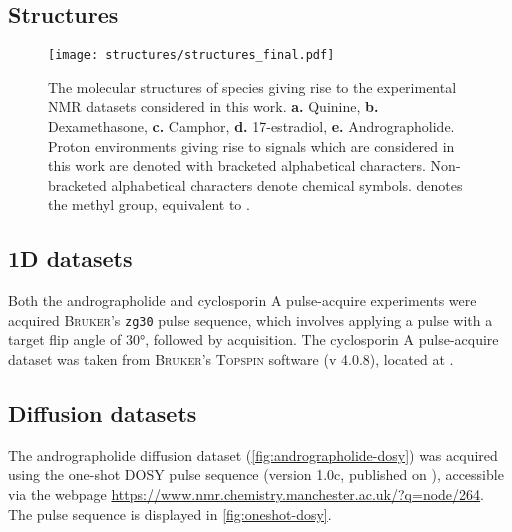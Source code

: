 \subsection{Structures}

\begin{figure}[H]
    \centering
    \texttt{[image: structures/structures\_final.pdf]}
    \caption[
        The molecular structures of species giving rise to the experimental
        \acs{NMR} datasets considered in this work.
    ]{
        The molecular structures of species giving rise to the experimental
        \acs{NMR} datasets considered in this work.
        \textbf{a.} Quinine,
        \textbf{b.} Dexamethasone,
        \textbf{c.} Camphor,
        \textbf{d.} 17\textbeta-estradiol,
        \textbf{e.} Andrographolide.
        Proton environments giving rise to signals which are considered in this
        work are denoted with bracketed alphabetical characters. Non-bracketed
        alphabetical characters denote chemical symbols.  denotes the methyl
        group, equivalent to .
    }
    \label{fig:structures}
\end{figure}

\subsection{\acs{1D} datasets}
Both the andrographolide and cyclosporin A pulse-acquire experiments were
acquired \textsc{Bruker}'s \texttt{zg30} pulse sequence, which involves
applying a pulse with a target flip angle of \ang{30}, followed by acquisition.
The cyclosporin A pulse-acquire dataset was taken from \textsc{Bruker}'s
\textsc{Topspin} software (v 4.0.8), located at
.



\subsection{Diffusion datasets}
The andrographolide diffusion dataset (\cref{fig:andrographolide-dosy})
was acquired using the one-shot \ac{DOSY} pulse sequence\cite{Pelta2002}
(version 1.0c, published on ), accessible via the webpage
\url{https://www.nmr.chemistry.manchester.ac.uk/?q=node/264}. The pulse
sequence is displayed in \cref{fig:oneshot-dosy}.

